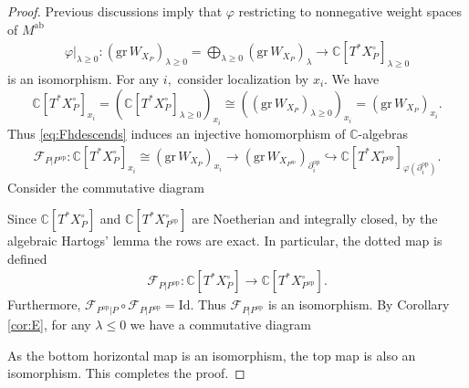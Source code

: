 \documentclass[11pt,a4paper,usenames,dvipsnames,reqno]{amsart}
\numberwithin{equation}{section}
\newcommand{\cc}{\mathbb C}
\theoremstyle{definition}
\theoremstyle{remark}
\begin{document}
\begin{proof}
Previous discussions imply that $\varphi$ restricting to nonnegative weight spaces of $M^{\mathrm{ab}}$
\begin{align*}
    \varphi|_{\lambda\ge 0}: (\mathrm{gr} \, W_{X_P})_{\lambda \ge 0}=\bigoplus_{\lambda\ge 0} (\mathrm{gr} \,W_{X_P})_{\lambda}\longrightarrow\cc[T^\ast X_P^\circ]_{\lambda\ge 0}
\end{align*}
is an isomorphism. For any $i,$ consider localization by $x_i$. We have $$\cc[T^\ast X_P^\circ]_{x_i}=(\cc[T^\ast X_P^\circ]_{\lambda\ge 0})_{x_i}\cong ((\mathrm{gr} \, W_{X_P})_{\lambda \ge 0})_{x_i}=(\mathrm{gr}\, W_{X_P})_{x_i}.$$ Thus \eqref{eq:Fhdescends} induces an injective homomorphism of $\cc$-algebras
\begin{align*}
    \mathcal{F}_{P|P^{\mathrm{op}}}:\cc[T^\ast X_P^\circ]_{x_i}\cong (\mathrm{gr} \, W_{X_P})_{x_i}\longrightarrow (\mathrm{gr} \, W_{X_{P^{\mathrm{op}}}})_{\partial_i^{\mathrm{op}}}\hookrightarrow \cc[T^\ast X_{P^{\mathrm{op}}}^\circ]_{\varphi(\partial_i^{\mathrm{op}})}.
\end{align*}
Consider the commutative diagram
\begin{center}
\end{center}
Since $\cc[T^\ast X_P^\circ]$ and  $\cc[T^\ast X_{P^{\mathrm{op}}}^\circ]$ are Noetherian \cite{FuLiu} and integrally closed, by the algebraic Hartogs' lemma the rows are exact. In particular, the dotted map is defined
\begin{align*}
    \mathcal{F}_{P|P^{\mathrm{op}}}:\cc[T^\ast X_P^\circ]\longrightarrow\cc[T^\ast X_{P^\mathrm{op}}^\circ].
\end{align*}
Furthermore, $\mathcal{F}_{P^{\mathrm{op}}|P}\circ \mathcal{F}_{P|P^{\mathrm{op}}}=\mathrm{Id}.$ Thus $ \mathcal{F}_{P|P^{\mathrm{op}}}$ is an isomorphism. By Corollary \ref{cor:E}, for any $\lambda\le 0$ we have a commutative diagram
\begin{center}
\end{center}
As the bottom horizontal map is an isomorphism, the top map is also an isomorphism. This completes the proof.
\end{proof}
\end{document}
